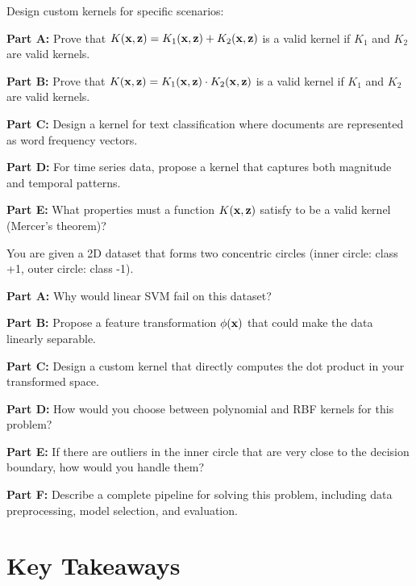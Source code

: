 \documentclass{article}
\newcounter{exercise}
\begin{document}
\begin{tcolorbox}[colback=blue!5!white,colframe=blue!75!black,title=Exercise \theexercise: Advanced Kernel Design]
Design custom kernels for specific scenarios:

\textbf{Part A:} Prove that $K(\mathbf{x}, \mathbf{z}) = K_1(\mathbf{x}, \mathbf{z}) + K_2(\mathbf{x}, \mathbf{z})$ is a valid kernel if $K_1$ and $K_2$ are valid kernels.

\textbf{Part B:} Prove that $K(\mathbf{x}, \mathbf{z}) = K_1(\mathbf{x}, \mathbf{z}) \cdot K_2(\mathbf{x}, \mathbf{z})$ is a valid kernel if $K_1$ and $K_2$ are valid kernels.

\textbf{Part C:} Design a kernel for text classification where documents are represented as word frequency vectors.

\textbf{Part D:} For time series data, propose a kernel that captures both magnitude and temporal patterns.

\textbf{Part E:} What properties must a function $K(\mathbf{x}, \mathbf{z})$ satisfy to be a valid kernel (Mercer's theorem)?
\end{tcolorbox}

\begin{tcolorbox}[colback=blue!5!white,colframe=blue!75!black,title=Exercise \theexercise: Comprehensive SVM Problem]
You are given a 2D dataset that forms two concentric circles (inner circle: class +1, outer circle: class -1).

\textbf{Part A:} Why would linear SVM fail on this dataset?

\textbf{Part B:} Propose a feature transformation $\phi(\mathbf{x})$ that could make the data linearly separable.

\textbf{Part C:} Design a custom kernel that directly computes the dot product in your transformed space.

\textbf{Part D:} How would you choose between polynomial and RBF kernels for this problem?

\textbf{Part E:} If there are outliers in the inner circle that are very close to the decision boundary, how would you handle them?

\textbf{Part F:} Describe a complete pipeline for solving this problem, including data preprocessing, model selection, and evaluation.
\end{tcolorbox}

\section{Key Takeaways}
\end{document}
